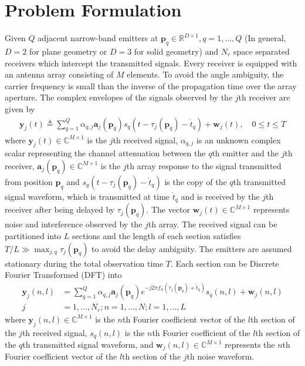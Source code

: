 \documentclass[review]{elsarticle}
\begin{document}
\section{Problem Formulation}
Given $Q$ adjacent narrow-band emitters at $\boldsymbol{p}_q\in \mathbb{R}^{D\times 1},q=1,...,Q$ (In general, $D=2$ for plane geometry or $D=3$ for solid geometry) and $N_r$ space separated receivers which intercept the transmitted signals. Every receiver is equipped with an antenna array consisting of $M$ elements. To avoid the angle ambiguity, the carrier frequency is small than the inverse of the propagation time over the array aperture. The complex envelopes of the signals observed by the $j$th receiver are given by
\begin{align}\label{yjt}
\boldsymbol{y}_j(t)\triangleq\sum_{q=1}^Q\alpha_{q,j}\boldsymbol{a}_j(\boldsymbol{p}_q)s_q(t-\tau_j(\boldsymbol{p}_q)-\mathring{t}_q)+\boldsymbol{w}_{j}(t),\quad 0\leq t\leq T
\end{align}
where $\boldsymbol{y}_j(t)\in \mathbb{C}^{M\times 1}$ is the $j$th received signal, $\alpha_{q,j}$ is an unknown complex scalar representing the channel attenuation between the $q$th emitter and the $j$th receiver, $\boldsymbol{a}_j(\boldsymbol{p}_q)\in \mathbb{C}^{M\times 1}$ is the $j$th array response to the signal transmitted from position $\boldsymbol{p}_q$ and $s_q(t-\tau_j(\boldsymbol{p}_q)-\mathring{t}_q)$ is the copy of the $q$th transmitted signal waveform, which is transmitted at time $\mathring{t}_q$ and is received by the $j$th receiver after being delayed by $\tau_j(\boldsymbol{p}_q)$. The vector $\boldsymbol{w}_j(t)\in \mathbb{C}^{M\times 1}$ represents noise and interference observed by the $j$th array. The received signal can be partitioned into $L$ sections and the length of each section satisfies $T/L\gg \max_{j,q}{\tau_j(\boldsymbol{p}_q)}$ to avoid the delay ambiguity. The emitters are assumed stationary during the total observation time $T$. Each section can be Discrete Fourier Transformed (DFT) into
\begin{align}\label{yjnl}
    \boldsymbol{y}_j(n,l)&=\sum_{q=1}^Q\alpha_{q,j}\boldsymbol{a}_j(\boldsymbol{p}_q)e^{-j2\pi f_n(\tau_j(\boldsymbol{p}_q)+\mathring{t}_q)}s_q(n,l)+\boldsymbol{w}_j(n,l)\\ \nonumber
    j&=1,...,N_r;n=1,...,N;l=1,...,L
\end{align}
where $\boldsymbol{y}_j(n,l)\in \mathbb{C}^{M\times 1}$ is the $n$th Fourier coefficient vector of the $l$th section of the $j$th received signal, $s_q(n,l)$ is the $n$th Fourier coefficient of the $l$th section of the $q$th transmitted signal waveform, and $\boldsymbol{w}_j(n,l)\in \mathbb{C}^{M\times 1}$ represents the $n$th Fourier coefficient vector of the $l$th section of the $j$th noise waveform.
\end{document}
